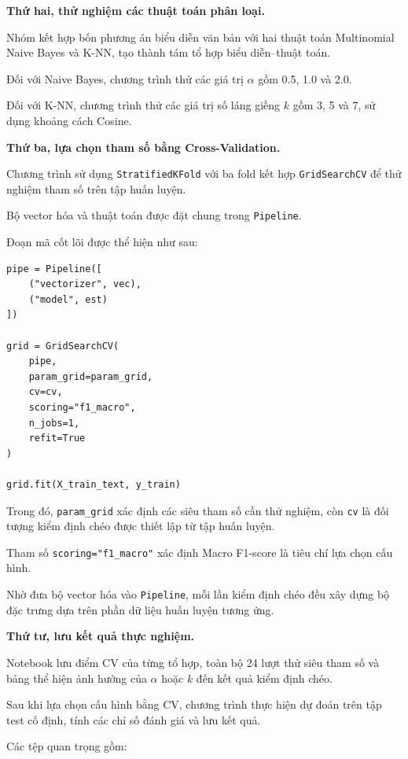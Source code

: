 \textbf{Thứ hai, thử nghiệm các thuật toán phân loại.}

Nhóm kết hợp bốn phương án biểu diễn văn bản với hai thuật toán Multinomial Naive Bayes và K-NN, tạo thành tám tổ hợp biểu diễn--thuật toán.

Đối với Naive Bayes, chương trình thử các giá trị $\alpha$ gồm 0.5, 1.0 và 2.0.

Đối với K-NN, chương trình thử các giá trị số láng giềng $k$ gồm 3, 5 và 7, sử dụng khoảng cách Cosine.

\textbf{Thứ ba, lựa chọn tham số bằng Cross-Validation.}

Chương trình sử dụng \texttt{StratifiedKFold} với ba fold kết hợp \texttt{GridSearchCV} để thử nghiệm tham số trên tập huấn luyện.

Bộ vector hóa và thuật toán được đặt chung trong \texttt{Pipeline}.

Đoạn mã cốt lõi được thể hiện như sau:

\begin{verbatim}
pipe = Pipeline([
    ("vectorizer", vec),
    ("model", est)
])

grid = GridSearchCV(
    pipe,
    param_grid=param_grid,
    cv=cv,
    scoring="f1_macro",
    n_jobs=1,
    refit=True
)

grid.fit(X_train_text, y_train)
\end{verbatim}

Trong đó, \texttt{param\_grid} xác định các siêu tham số cần thử nghiệm, còn \texttt{cv} là đối tượng kiểm định chéo được thiết lập từ tập huấn luyện.

Tham số \texttt{scoring="f1\_macro"} xác định Macro F1-score là tiêu chí lựa chọn cấu hình.

Nhờ đưa bộ vector hóa vào \texttt{Pipeline}, mỗi lần kiểm định chéo đều xây dựng bộ đặc trưng dựa trên phần dữ liệu huấn luyện tương ứng.

\textbf{Thứ tư, lưu kết quả thực nghiệm.}

Notebook lưu điểm CV của từng tổ hợp, toàn bộ 24 lượt thử siêu tham số và bảng thể hiện ảnh hưởng của $\alpha$ hoặc $k$ đến kết quả kiểm định chéo.

Sau khi lựa chọn cấu hình bằng CV, chương trình thực hiện dự đoán trên tập test cố định, tính các chỉ số đánh giá và lưu kết quả.

Các tệp quan trọng gồm:

